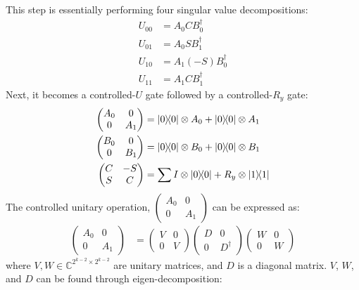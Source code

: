 \documentclass[a4paper, 11pt]{article}
\begin{document}
This step is essentially performing four singular value decompositions:
\begin{align}
  U_{00} &= A_{0} C B_{0}^{\dagger} \\
  U_{01} &= A_{0} S B_{1}^{\dagger} \\
  U_{10} &= A_{1} (-S) B_{0}^{\dagger} \\
  U_{11} &= A_{1} C B_{1}^{\dagger} 
\end{align}
Next, it becomes a controlled-$U$ gate followed by a controlled-$R_y$ gate:
\begin{align}
  \begin{pmatrix}
    A_{0} & 0 \\
    0 & A_{1}
  \end{pmatrix} &= \ketbra{0} \otimes A_0 + \ketbra{0} \otimes A_{1} \\
  \begin{pmatrix}
    B_{0} & 0 \\
    0 & B_{1}
  \end{pmatrix}
  &= \ketbra{0} \otimes B_0 + \ketbra{0} \otimes B_{1} \\
  \begin{pmatrix}
    C & -S \\
    S & C
  \end{pmatrix} 
  &= \sum I \otimes \ketbra{0} +  R_y  \otimes \ketbra{1}
\end{align}
The controlled unitary operation, $\begin{pmatrix}
  A_{0} & 0 \\
  0 & A_{1}
\end{pmatrix}$ can be expressed as:
\begin{align}
  \begin{pmatrix}
    A_{0} & 0 \\
    0 & A_{1}
  \end{pmatrix} &= 
  \begin{pmatrix}
    V & 0 \\
    0 & V
  \end{pmatrix}
  \begin{pmatrix}
    D & 0 \\
    0 & D^{\dagger}
  \end{pmatrix}
  \begin{pmatrix}
    W & 0 \\
    0 & W
  \end{pmatrix}
\end{align}
where $V, W \in \mathbb{C}^{2^{k-2} \times 2^{k-2}}$ are unitary matrices, and $D$ is a diagonal matrix. $V$, $W$, and $D$ can be found through eigen-decomposition:
\end{document}
